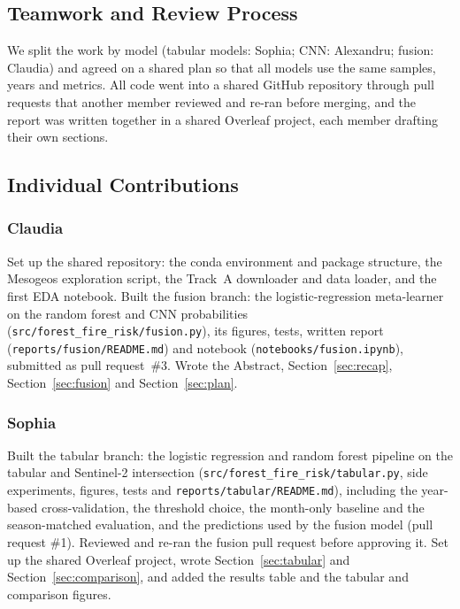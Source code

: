 \label{sec:contributions}


\subsection*{Teamwork and Review Process}
We split the work by model (tabular models: Sophia; CNN: Alexandru; fusion: Claudia) and agreed on a shared plan so that all models use the same samples, years and metrics. All code went into a shared GitHub repository through pull requests that another member reviewed and re-ran before merging, and the report was written together in a shared Overleaf project, each member drafting their own sections.

\subsection*{Individual Contributions}

\subsubsection*{Claudia}
Set up the shared repository: the conda environment and package structure, the Mesogeos exploration script, the Track~A downloader and data loader, and the first EDA notebook. Built the fusion branch: the logistic-regression meta-learner on the random forest and CNN probabilities (\texttt{src/forest\_fire\_risk/fusion.py}), its figures, tests, written report (\texttt{reports/fusion/README.md}) and notebook (\texttt{notebooks/fusion.ipynb}), submitted as pull request~\#3. Wrote the Abstract, Section~\ref{sec:recap}, Section~\ref{sec:fusion} and Section~\ref{sec:plan}.

\subsubsection*{Sophia}
Built the tabular branch: the logistic regression and random forest pipeline on the tabular and Sentinel-2 intersection (\texttt{src/forest\_fire\_risk/tabular.py}, side experiments, figures, tests and \texttt{reports/tabular/README.md}), including the year-based cross-validation, the threshold choice, the month-only baseline and the season-matched evaluation, and the predictions used by the fusion model (pull request \#1). Reviewed and re-ran the fusion pull request before approving it. Set up the shared Overleaf project, wrote Section~\ref{sec:tabular} and Section~\ref{sec:comparison}, and added the results table and the tabular and comparison figures.

